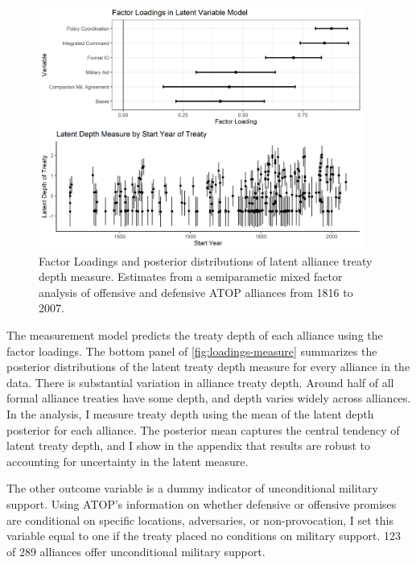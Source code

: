 \documentclass[12pt]{article}
\begin{document}
\begin{figure}[hbtp]
\centering
\includegraphics[width=0.95\textwidth]{../figures/loadings-measure.png}
\caption{Factor Loadings and posterior distributions of latent alliance treaty depth measure. Estimates from a semiparametic mixed factor analysis of offensive and defensive ATOP alliances from 1816 to 2007.}
\label{fig:loadings-measure}
\end{figure}


The measurement model predicts the treaty depth of each alliance using the factor loadings. 
The bottom panel of \autoref{fig:loadings-measure} summarizes the posterior distributions of the latent treaty depth measure for every alliance in the data. 
There is substantial variation in alliance treaty depth. 
Around half of all formal alliance treaties have some depth, and depth varies widely across alliances.
In the analysis, I measure treaty depth using the mean of the latent depth posterior for each alliance. 
The posterior mean captures the central tendency of latent treaty depth, and I show in the appendix that results are robust to accounting for uncertainty in the latent measure. 


The other outcome variable is a dummy indicator of unconditional military support. 
Using ATOP's information on whether defensive or offensive promises are conditional on specific locations, adversaries, or non-provocation, I set this variable equal to one if the treaty placed no conditions on military support.
123 of 289 alliances offer unconditional military support. 
\end{document}
